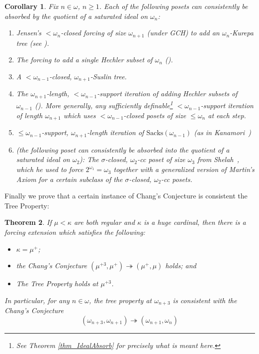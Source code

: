 \documentclass{amsart}
\newtheorem{theorem}{Theorem}
\newtheorem{corollary}[theorem]{Corollary}
\begin{document}
\begin{corollary}\label{cor_Examples}
Fix $n \in \omega$, $n \ge 1$.  Each of the following posets can consistently be absorbed by the quotient of a saturated ideal on $\omega_{n}$:
\begin{enumerate}
 \item Jensen's $<\omega_n$-closed forcing of size $\omega_{n+1}$ (under GCH) to add an $\omega_{n}$-Kurepa tree (see \cite{MR2768691}).
 \item The forcing to add a single Hechler subset of $\omega_{n}$ (\cite{MR1355135}).
 \item A $<\omega_{n-1}$-closed, $\omega_{n+1}$-Suslin tree.
 \item The $\omega_{n+1}$-length, $<\omega_{n-1}$-support iteration of adding Hechler subsets of $\omega_{n-1}$ (\cite{MR1355135}).  More generally, any sufficiently definable\footnote{See Theorem \ref{thm_IdealAbsorb} for precisely what is meant here.} $<\omega_{n-1}$-support iteration of length $\omega_{n+1}$ which uses $<\omega_{n-1}$-closed posets of size $\le \omega_{n}$ at each step. 
 \item $\le \omega_{n-1}$-support, $\omega_{n+1}$-length iteration of $\text{Sacks}(\omega_{n-1})$ (as in Kanamori~\cite{MR593029})  
 \item (the following poset can consistently be absorbed into the quotient of a saturated ideal on $\omega_2$):  The $\sigma$-closed, $\omega_2$-cc poset of size $\omega_3$ from Shelah~\cite{Shelah_WeakGenMA}, which he used to force $2^{\omega_1} = \omega_3$ together with a generalized version of Martin's Axiom for a certain subclass of the $\sigma$-closed, $\omega_2$-cc posets. 
\end{enumerate}
\end{corollary}




Finally we prove that a certain instance of Chang's Conjecture is consistent the Tree Property:
\begin{theorem}\label{thm_ChangTree}
If $\mu < \kappa$ are both regular and $\kappa$ is a huge cardinal, then there is a forcing extension which satisfies the following:
\begin{itemize}
 \item $\kappa = \mu^+$;
 \item the Chang's Conjecture $(\mu^{+3}, \mu^+) \twoheadrightarrow (\mu^+, \mu)$ holds; and
 \item The Tree Property holds at $\mu^{+3}$.
\end{itemize}
In particular, for any $n \in \omega$, the tree property at $\omega_{n+3}$ is consistent with the Chang's Conjecture
\[
(\omega_{n+3}, \omega_{n+1}) \twoheadrightarrow (\omega_{n+1}, \omega_n)
\] 
\end{theorem}
\end{document}
